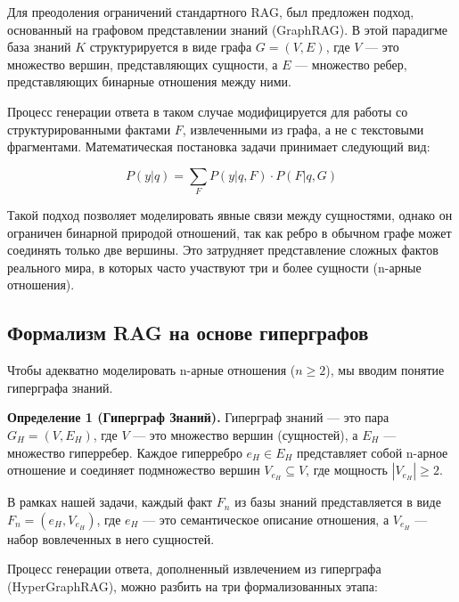 \documentclass{article}
\begin{document}
Для преодоления ограничений стандартного RAG, был предложен подход, основанный на графовом представлении знаний (GraphRAG). В этой парадигме база знаний $K$ структурируется в виде графа $G = (V, E)$, где $V$ — это множество вершин, представляющих сущности, а $E$ — множество ребер, представляющих бинарные отношения между ними.

Процесс генерации ответа в таком случае модифицируется для работы со структурированными фактами $F$, извлеченными из графа, а не с текстовыми фрагментами. Математическая постановка задачи принимает следующий вид:

\begin{equation}
P(y|q) = \sum_F P(y|q,F) \cdot P(F|q,G)
\label{eq:rag_graph}
\end{equation}

Такой подход позволяет моделировать явные связи между сущностями, однако он ограничен бинарной природой отношений, так как ребро в обычном графе может соединять только две вершины. Это затрудняет представление сложных фактов реального мира, в которых часто участвуют три и более сущности (n-арные отношения).

\subsection{Формализм RAG на основе гиперграфов}

Чтобы адекватно моделировать n-арные отношения ($n \ge 2$), мы вводим понятие гиперграфа знаний.

\textbf{Определение 1 (Гиперграф Знаний).} Гиперграф знаний — это пара $G_H = (V, E_H)$, где $V$ — это множество вершин (сущностей), а $E_H$ — множество гиперребер. Каждое гиперребро $e_H \in E_H$ представляет собой n-арное отношение и соединяет подмножество вершин $V_{e_H} \subseteq V$, где мощность $|V_{e_H}| \ge 2$.

В рамках нашей задачи, каждый факт $F_n$ из базы знаний представляется в виде $F_n = (e_H, V_{e_H})$, где $e_H$ — это семантическое описание отношения, а $V_{e_H}$ — набор вовлеченных в него сущностей.

Процесс генерации ответа, дополненный извлечением из гиперграфа (HyperGraphRAG), можно разбить на три формализованных этапа:
\end{document}
